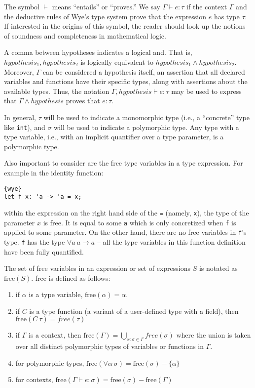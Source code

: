 \documentclass[a4paper, 12pt]{article}
\newcommand{\free}{\text{free}}
\begin{document}
The symbol $\vdash$ means ``entails'' or ``proves.'' We say $\Gamma\vdash e: \tau$ if the context $\Gamma$ and the deductive rules of Wye's type system prove that the expression $e$ has type $\tau$. If interested in the origins of this symbol, the reader should look up the notions of soundness and completeness in mathematical logic.

A comma between hypotheses indicates a logical and. That is, $hypothesis_1, hypothesis_2$ is logically equivalent to $hypothesis_1 \wedge hypothesis_2$. Moreover, $\Gamma$ can be considered a hypothesis itself, an assertion that all declared variables and functions have their specific types, along with assertions about the available types. Thus, the notation $\Gamma, hypothesis \vdash e: \tau$ may be used to express that $\Gamma \wedge hypothesis$ proves that $e: \tau$.

In general, $\tau$ will be used to indicate a monomorphic type (i.e., a ``concrete'' type like \texttt{int}), and $\sigma$ will be used to indicate a polymorphic type. Any type with a type variable, i.e., with an implicit quantifier over a type parameter, is a polymorphic type.

Also important to consider are the free type variables in a type expression. For example in the identity function:
\begin{lstlisting}{wye}
let f x: 'a -> 'a = x;
\end{lstlisting}
within the expression on the right hand side of the \texttt{=} (namely, \texttt{x}), the type of the parameter $x$ is free. It is equal to some \texttt{a} which is only concretized when \texttt{f} is applied to some parameter. On the other hand, there are no free variables in \texttt{f}'s type. \texttt{f} has the type $\forall a\: a\to a$ -- all the type variables in this function definition have been fully quantified.

The set of free variables in an expression or set of expressions $S$ is notated as $\free(S)$. free is defined as follows:
\begin{enumerate}
\item if $\alpha$ is a type variable, $\free(\alpha) = \alpha$.
\item if $C$ is a type function (a variant of a user-defined type with a field), then $\free(C\: \tau) = free(\tau)$
\item if $\Gamma$ is a context, then $\free(\Gamma) = \bigcup_{x : \sigma\in\Gamma }free(\sigma)$ where the union is taken over all distinct polymorphic types of variables or functions in $\Gamma$.
\item for polymorphic types, $\free(\forall \alpha \: \sigma) = \free(\sigma) - \{\alpha\}$
\item for contexts, $\free(\Gamma\vdash e: \sigma) = \free(\sigma) - \free(\Gamma)$
\end{enumerate}
\end{document}
